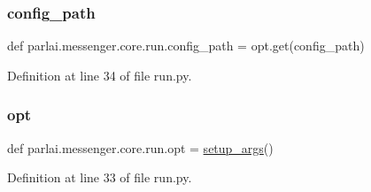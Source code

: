 \subsubsection{\texorpdfstring{config\+\_\+path}{config\_path}}
{\footnotesize\ttfamily def parlai.\+messenger.\+core.\+run.\+config\+\_\+path = opt.\+get(\textquotesingle{}config\+\_\+path\textquotesingle{})}



Definition at line 34 of file run.\+py.

\mbox{\label{namespaceparlai_1_1messenger_1_1core_1_1run_af3614368a24b91db4ebaeb81865b09a1}} 
\subsubsection{\texorpdfstring{opt}{opt}}
{\footnotesize\ttfamily def parlai.\+messenger.\+core.\+run.\+opt = \hyperlink{namespaceparlai_1_1messenger_1_1core_1_1run_a32e58ff98e486caecc5f8941e70db244}{setup\+\_\+args}()}



Definition at line 33 of file run.\+py.

